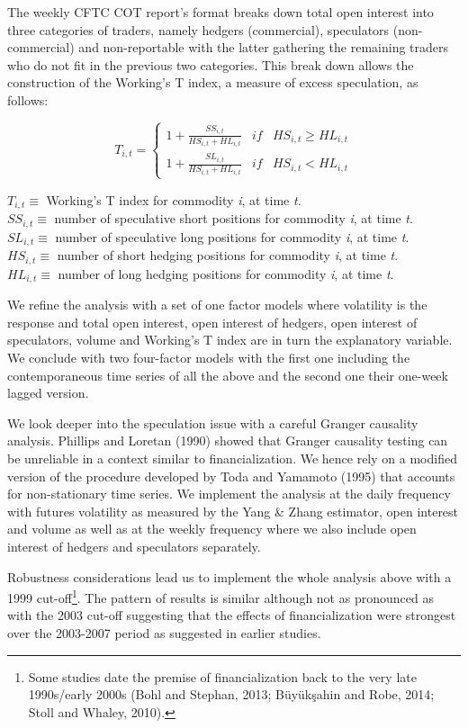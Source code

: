 \documentclass[]{elsarticle} %
\begin{document}
The weekly CFTC COT report's format breaks down total open interest into
three categories of traders, namely hedgers (commercial), speculators
(non-commercial) and non-reportable with the latter gathering the
remaining traders who do not fit in the previous two categories. This
break down allows the construction of the Working's T index, a measure
of excess speculation, as follows:

\[
T_{i, t} =
\left\{\begin{matrix}
1+\frac{SS_{i, t}}{HS_{i, t}+HL_{i, t}} & if & HS_{i, t} \geq HL_{i, t}\\ 
1+\frac{SL_{i, t}}{HS_{i, t}+HL_{i, t}} & if & HS_{i, t} < HL_{i, t}
\end{matrix}\right.
\]

\(T_{i, t}\equiv\) Working's T index for commodity \textit{i}, at time
\textit{t}.\\
\(SS_{i, t}\equiv\) number of speculative short positions for commodity
\textit{i}, at time \textit{t}.\\
\(SL_{i, t}\equiv\) number of speculative long positions for commodity
\textit{i}, at time \textit{t}.\\
\(HS_{i, t}\equiv\) number of short hedging positions for commodity
\textit{i}, at time \textit{t}.\\
\(HL_{i, t}\equiv\) number of long hedging positions for commodity
\textit{i}, at time \textit{t}.

We refine the analysis with a set of one factor models where volatility
is the response and total open interest, open interest of hedgers, open
interest of speculators, volume and Working's T index are in turn the
explanatory variable. We conclude with two four-factor models with the
first one including the contemporaneous time series of all the above and
the second one their one-week lagged version.

We look deeper into the speculation issue with a careful Granger
causality analysis. Phillips and Loretan (1990) showed that Granger
causality testing can be unreliable in a context similar to
financialization. We hence rely on a modified version of the procedure
developed by Toda and Yamamoto (1995) that accounts for non-stationary
time series. We implement the analysis at the daily frequency with
futures volatility as measured by the Yang \& Zhang estimator, open
interest and volume as well as at the weekly frequency where we also
include open interest of hedgers and speculators separately.

Robustness considerations lead us to implement the whole analysis above
with a 1999 cut-off\footnote{Some studies date the premise of
  financialization back to the very late 1990s/early 2000s (Bohl and
  Stephan, 2013; Büyükşahin and Robe, 2014; Stoll and Whaley, 2010).}.
The pattern of results is similar although not as pronounced as with the
2003 cut-off suggesting that the effects of financialization were
strongest over the 2003-2007 period as suggested in earlier studies.
\end{document}
